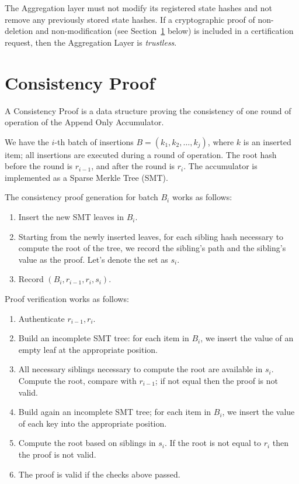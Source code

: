 \documentclass[twocolumn]{article}
\begin{document}
The Aggregation layer must not modify its registered state hashes and not remove any previously stored state hashes. If a cryptographic proof of non-deletion and non-modification (see Section~\ref{sec:consistency-proof} below) is included in a certification request, then the Aggregation Layer is \emph{trustless}.


\section{Consistency Proof}
\label{sec:consistency-proof}

A Consistency Proof is a data structure proving the consistency of one round of operation of the Append Only Accumulator.

We have the $i$-th batch of insertions $B = (k_1, k_2, \dots, k_j)$, where $k$ is an inserted item; all insertions are executed during a round of operation. The root hash before the round is $r_{i-1}$, and after the round is $r_i$. The accumulator is implemented as a Sparse Merkle Tree (SMT).

The consistency proof generation for batch $B_i$ works as follows:

\begin{enumerate}
    \item Insert the new SMT leaves in $B_i$.
    \item Starting from the newly inserted leaves, for each sibling hash necessary to compute the root of the tree, we record the sibling's path and the sibling's value as the proof. Let's denote the set as $s_i$.
    \item Record $(B_i, r_{i-1}, r_i, s_i)$.
\end{enumerate}

Proof verification works as follows:

\begin{enumerate}
    \item Authenticate $r_{i-1}, r_i$.
    \item Build an incomplete SMT tree: for each item in $B_i$, we insert the value of an empty leaf at the appropriate position.
    \item All necessary siblings necessary to compute the root are available in $s_i$. Compute the root, compare with $r_{i-1}$; if not equal then the proof is not valid.
    \item Build again an incomplete SMT tree; for each item in $B_i$, we insert the value of each key into the appropriate position.
    \item Compute the root based on siblings in $s_i$. If the root is not equal to $r_i$ then the proof is not valid.
    \item The proof is valid if the checks above passed.
\end{enumerate}
\end{document}
